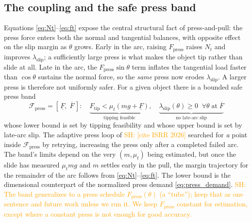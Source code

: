 \documentclass[10pt, conference]{IEEEtran}
\newcommand{\sh}[1]{\textcolor{orange}{SH: #1}}
\newcommand{\isrr}{\sh{[cite ISRR 2026]}}
\begin{document}
\subsection{The coupling and the safe press band}
Equations \eqref{eq:Nt}--\eqref{eq:ft} expose the central structural fact of press-and-pull: the press force enters both the normal and tangential balances, with opposite effect on the slip margin as $\theta$ grows. Early in the arc, raising $F_{\mathrm{press}}$ raises $N_t$ and improves $\lambda_{\mathrm{slip}}$; a sufficiently large press is what makes the object tip rather than slide at all. Late in the arc, the $F_{\mathrm{press}}\sin\theta$ term inflates the tangential load faster than $\cos\theta$ sustains the normal force, so the \emph{same} press now erodes $\lambda_{\mathrm{slip}}$. A larger press is therefore not uniformly safer. For a given object there is a bounded safe press band
\begin{equation}
    \mathcal{F}_{\mathrm{press}} = \left[\, \underline{F},\; \overline{F} \,\right]:
    \quad \underbrace{F_{\mathrm{tip}} < \mu_t (mg + \underline{F})}_{\text{tipping feasible}}, \quad \underbrace{\lambda_{\mathrm{slip}}(\theta) \geq 0 \;\; \forall \theta \;\text{at}\; \overline{F}}_{\text{no late-arc slip}}
    \label{eq:press_band}
\end{equation}
whose lower bound is set by tipping feasibility and whose upper bound is set by late-arc slip. The adaptive press loop of \isrr{} searched for \emph{a} point inside $\mathcal{F}_{\mathrm{press}}$ by retrying, increasing the press only after a completed failed arc. The band's limits depend on the very $(m, \mu_t)$ being estimated, but once the slide has measured $\mu_t m g$ and $m$ settles early in the pull, the margin trajectory for the remainder of the arc follows from \eqref{eq:Nt}--\eqref{eq:ft}. The lower bound is the dimensional counterpart of the normalized press demand \eqref{eq:press_demand}. \sh{The band generalizes to a press schedule $F_{\mathrm{press}}(\theta)$ (a ``tube''); keep that as one sentence and future work unless we run it. We keep $F_{\mathrm{press}}$ constant for estimation, except where a constant press is not enough for good accuracy.}
\end{document}
